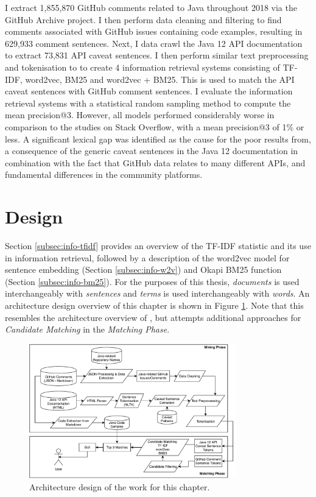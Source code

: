 I extract 1,855,870 GitHub comments related to Java throughout 2018 via the GitHub Archive project. I then perform data cleaning and filtering to find comments associated with GitHub issues containing code examples, resulting in 629,933 comment sentences. Next, I data crawl the Java 12 API documentation to extract 73,831 API caveat sentences. I then perform similar text preprocessing and tokenisation to \cite{jiamou} to create 4 information retrieval systems consisting of TF-IDF, word2vec, BM25 and word2vec + BM25. This is used to match the API caveat sentences with GitHub comment sentences. I evaluate the information retrieval systems with a statistical random sampling method to compute the mean precision@3. However, all models performed considerably worse in comparison to the studies on Stack Overflow, with a mean precision@3 of 1\% or less. A significant lexical gap was identified as the cause for the poor results from, a consequence of the generic caveat sentences in the Java 12 documentation in combination with the fact that GitHub data relates to many different APIs, and fundamental differences in the community platforms.

\section{Design}
\label{sec:info-design}
Section \ref{subsec:info-tfidf} provides an overview of the TF-IDF statistic and its use in information retrieval, followed by a description of the word2vec model for sentence embedding (Section \ref{subsec:info-w2v}) and Okapi BM25 function (Section \ref{subsec:info-bm25}). For the purposes of this thesis, \textit{documents} is used interchangeably with \textit{sentences} and \textit{terms} is used interchangeably with \textit{words}. An architecture design overview of this chapter is shown in Figure \ref{fig:github-architecture}. Note that this resembles the architecture overview of \cite{jiamou}, but attempts additional approaches for \textit{Candidate Matching} in the \textit{Matching Phase}.

\begin{figure}
	\label{fig:github-architecture}
	\centering
	\includegraphics[width=0.8\textwidth]{figs/github-architecture.pdf}
	\caption{Architecture design of the work for this chapter.}
\end{figure}

